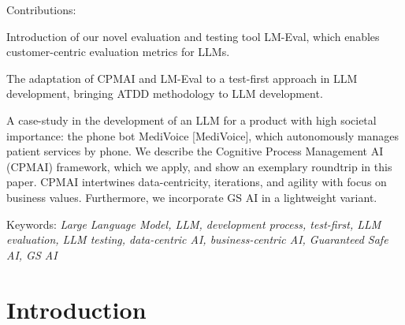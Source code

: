 \documentclass[twocolumn]{article}
\begin{document}
Contributions:
\begin{compactitem}
\item Introduction of our novel evaluation and testing tool LM-Eval, which enables customer-centric evaluation metrics for LLMs.
\item The adaptation of CPMAI and LM-Eval to a test-first approach in LLM development, bringing ATDD methodology to LLM development.
\item A case-study in the development of an LLM for a product with high societal importance:
  the phone bot MediVoice [MediVoice], which autonomously manages patient services by phone. We describe the Cognitive Process Management AI (CPMAI) framework,
  which we apply, and show an exemplary roundtrip in this paper. CPMAI intertwines data-centricity, iterations, and agility with focus on business values.
  Furthermore, we incorporate GS AI in a lightweight variant.
\end{compactitem}

Keywords: {\em Large Language Model, LLM, development process, test-first, LLM evaluation, LLM testing, data-centric AI, business-centric AI, Guaranteed Safe AI, GS AI}

\section{Introduction}
\end{document}

